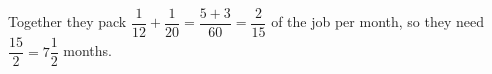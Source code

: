Together they pack $\dfrac1{12}+\dfrac1{20}=\dfrac{5+3}{60}=\dfrac2{15}$ of the job per month, so they need $\dfrac{15}{2}=\boxed{7\dfrac12}$ months.
